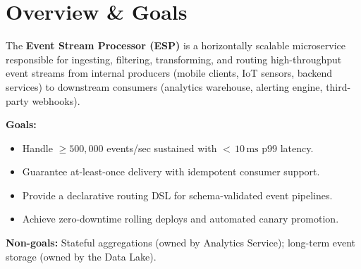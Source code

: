 \section{Overview \& Goals}

The \textbf{Event Stream Processor (ESP)} is a horizontally scalable microservice
responsible for ingesting, filtering, transforming, and routing high-throughput
event streams from internal producers (mobile clients, IoT sensors, backend
services) to downstream consumers (analytics warehouse, alerting engine,
third-party webhooks).

\textbf{Goals:}
\begin{itemize}[leftmargin=1.4em, itemsep=2pt, topsep=3pt]
  \item Handle $\geq 500{,}000$ events/sec sustained with ${<}\,10\,\mathrm{ms}$ p99 latency.
  \item Guarantee at-least-once delivery with idempotent consumer support.
  \item Provide a declarative routing DSL for schema-validated event pipelines.
  \item Achieve zero-downtime rolling deploys and automated canary promotion.
\end{itemize}

\textbf{Non-goals:} Stateful aggregations (owned by Analytics Service);
long-term event storage (owned by the Data Lake).

